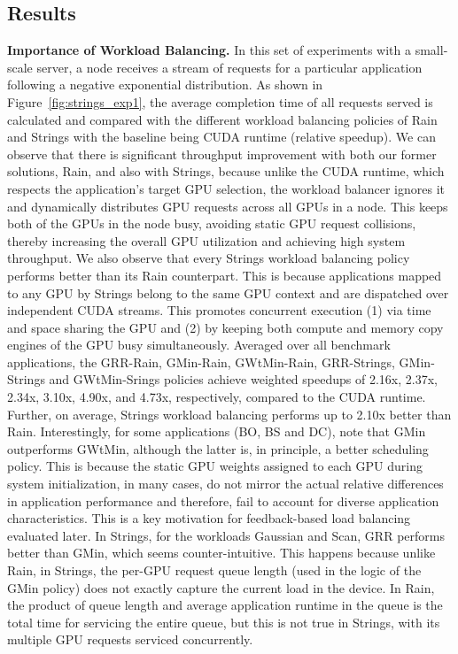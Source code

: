 \subsection{Results}
\textbf{Importance of Workload Balancing. }In this set of experiments with a small-scale server, a node receives a stream of requests for a particular application following a negative exponential distribution. As shown in Figure~\ref{fig:strings_exp1}, the average completion time of all requests served is calculated and compared with the different workload balancing policies of Rain and Strings with the baseline being CUDA runtime (relative speedup). We can observe that there is significant throughput improvement with both our former solutions, Rain, and also with Strings, because unlike the CUDA runtime, which respects the application’s target GPU selection, the workload balancer ignores it and dynamically distributes GPU requests across all GPUs in a node. This keeps both of the GPUs in the node busy, avoiding static GPU request collisions, thereby increasing the overall GPU utilization and achieving high system throughput. We also observe that every Strings workload balancing policy performs better than its Rain counterpart. This is because applications mapped to any GPU by Strings belong to the same GPU context and are dispatched over independent CUDA streams. This promotes concurrent execution (1) via time and space sharing the GPU and (2) by keeping both compute and memory copy engines of the GPU busy simultaneously. Averaged over all benchmark applications, the GRR-Rain, GMin-Rain, GWtMin-Rain, GRR-Strings, GMin-Strings and GWtMin-Srings policies achieve weighted speedups of 2.16x, 2.37x, 2.34x, 3.10x, 4.90x, and 4.73x,  respectively,  compared  to the CUDA runtime. Further, on average, Strings workload balancing performs up to 2.10x better than Rain. Interestingly, for some applications (BO, BS and DC), note that GMin outperforms GWtMin, although the latter is, in principle, a better scheduling policy. This is because the static GPU weights assigned to each GPU during system initialization, in many cases, do not mirror the actual relative differences in application performance and therefore, fail to account for diverse application characteristics. This is a  key motivation for feedback-based  load  balancing  evaluated later. In   Strings, for   the   workloads   Gaussian   and  Scan,  GRR performs better than GMin, which seems counter-intuitive. This happens because unlike Rain, in Strings, the per-GPU request queue length (used in the logic of the GMin policy) does not exactly capture the current load in the device. In Rain, the product of queue length and average application runtime in the queue is the total time for servicing the entire queue, but this is not true in Strings, with its multiple GPU requests serviced concurrently. 
